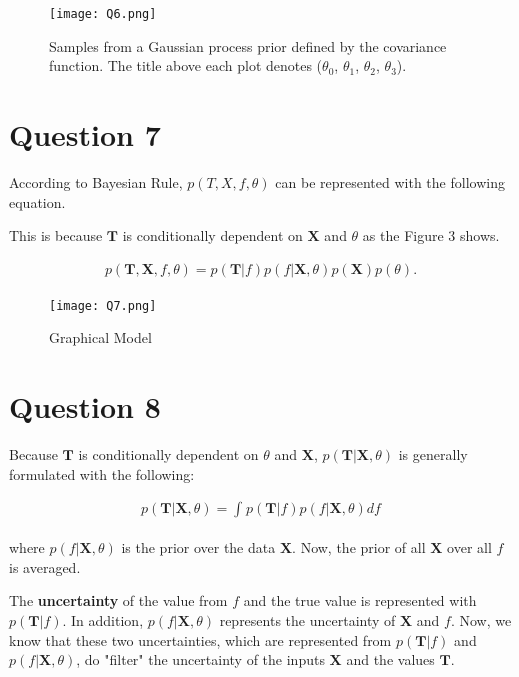 \documentclass[12pt,letterpaper]{article}
\begin{document}
\begin{figure}[htb]
\centering
\texttt{[image: Q6.png]} 
\caption{Samples from a Gaussian process prior defined by the covariance function. The title above each plot denotes ($\theta_0$, $\theta_1$, $\theta_2$, $\theta_3$).}
\end{figure}


\section*{Question 7}
According to Bayesian Rule,
$p(T, X, f, \theta)$ can be represented with the following equation.

This is because $\textbf{T}$ is conditionally dependent on $\textbf{X}$ and $\theta$ as the Figure 3 shows.

\begin{equation}
\begin{split}
p(\textbf{T}, \textbf{X}, f, \theta) = p(\textbf{T}|f) p(f|\textbf{X},\theta) p(\textbf{X}) p(\theta).
\end{split}
\end{equation}

\begin{figure}[htb]
\centering
\texttt{[image: Q7.png]} 
\caption{Graphical Model}
\end{figure}


\section*{Question 8}
Because $\textbf{T}$ is conditionally dependent on $\theta$ and $\textbf{X}$,
$p(\textbf{T}|\textbf{X}, \theta)$ is generally formulated with the following:

\begin{equation}
\begin{split}
p(\textbf{T}|\textbf{X}, \theta) = 
\int_{}{} p(\textbf{T}|f) p(f|\textbf{X}, \theta) df
\end{split}
\end{equation}

where $p(f|\textbf{X}, \theta)$ is the prior over the data $\textbf{X}$.
Now, the prior of all $\textbf{X}$ over all $f$ is averaged.


The \textbf{uncertainty} of the value from $f$ and the true value
is represented with $p(\textbf{T}|f)$.
In addition, $p(f|\textbf{X},\theta)$ represents the uncertainty of $\textbf{X}$ and $f$.
Now, we know that these two uncertainties, which are represented from $p(\textbf{T}|f)$ and $p(f|\textbf{X},\theta)$, do "filter" the uncertainty of the inputs $\textbf{X}$ and the values $\textbf{T}$.
\end{document}
